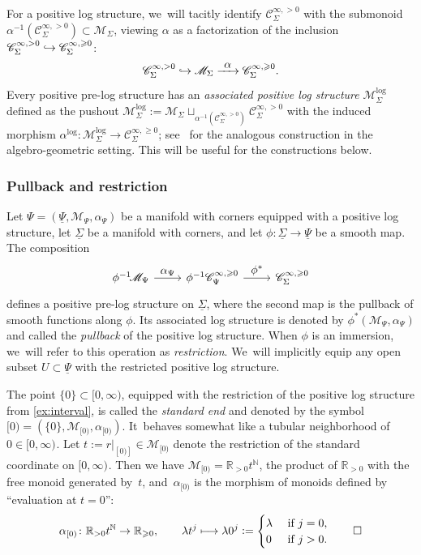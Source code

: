 \documentclass[10pt]{amsart}
\let\tst\textstyle
\newcommand\mto{\mathchoice{\longmapsto}{\mapsto}{\mapsto}{\mapsto}}
\newcommand\hto{\mathrel{\lhook\joinrel\to}}
\newcommand{\To}[1]{\mathchoice{\xrightarrow{\textstyle\kern4pt#1\kern3pt}}{\stackrel{#1}{\longrightarrow}}{}{}}
\theoremstyle{definition}
\theoremstyle{remark}
\newenvironment{example}
  {\pushQED{\qed}\renewcommand{\qedsymbol}{$\lozenge$}\examplex}
  {\popQED\endexamplex}
\let\defn\emph
\newcommand{\RR}{\mathbb{R}}
\newcommand{\NN}{\mathbb{N}}
\newcommand{\halfspc}[1]{[0,\infty)^{#1}}
\renewcommand{\ge}{\geqslant}
\newcommand{\defas}{\mathrel{\mathop:}=}
\newcommand{\cM}{\mathscr{M}}
\newcommand{\Cinfpos}[1]{\mathscr{C}^{\infty, > 0}_{#1}}
\newcommand{\Cinfge}[1]{\mathscr{C}^{\infty, \ge 0}_{#1}}
\newcommand{\Sig}{\Sigma}
\newcommand{\uSig}{\underline{\Sigma}}
\begin{document}
For a positive log structure, we~will tacitly identify $\Cinfpos{\Sig}$ with the submonoid $\alpha^{-1}(\Cinfpos{\Sig}) \subset \cM_\Sig$, viewing $\alpha$ as a factorization of the inclusion $\Cinfpos{\Sig} \hto\Cinfge{\Sig}$:\vspace*{-3pt}
\[
\Cinfpos{\Sig}\hto \cM_\Sig \To{\alpha} \Cinfge{\Sig}.
\]
Every positive pre-log structure has an \defn{associated positive log structure} $\cM_{\Sig}^{\log}$ defined as the pushout $\cM_{\Sig}^{\log} := \cM_{\Sig} \sqcup_{\alpha^{-1}(\Cinfpos{\Sig})} \Cinfpos{\Sig}$
with the induced morphism $\alpha^{\log }: \cM_{\Sig}^{\log} \to \Cinfge{\Sig}$; see~\cite[\S{}I.1.1 and \S{}III.1.1.3]{Ogus} for the analogous construction in the algebro-geometric setting. This will be useful for the constructions below.

\subsubsection{Pullback and restriction}

Let $\Psi=(\underline{\Psi},\cM_\Psi,\alpha_\Psi)$ be a manifold with corners equipped with a positive log structure, let $\uSig$ be a manifold with corners, and let $\phi:\uSig\to \underline{\Psi}$ be a smooth map. The composition\vspace*{-3pt}
\[
\begin{tikzcd}
\phi^{-1}\!\cM_{\Psi} \ar[r,"\tst \alpha_\Psi"] & \phi^{-1}\Cinfge{\Psi} \ar[r,"\tst \phi^*"] & \Cinfge{\Sig}
\end{tikzcd}
\]
defines a positive pre-log structure on $\uSig$, where the second map is the pullback of smooth functions along $\phi$. Its associated log structure
is denoted by $\phi^*(\cM_\Psi,\alpha_\Psi)$ and called the \defn{pullback} of the positive log structure. When $\phi$ is an immersion, we~will refer to this operation as \defn{restriction}. We~will implicitly equip any open subset $U\subset \underline{\Psi}$ with the restricted positive log structure.

\begin{example}\label{ex:endpoint}
The point $\{0\}\subset [0,\infty)$, equipped with the restriction of the positive log structure from \autoref{ex:interval}, is called the \defn{standard end} and denoted by the symbol $[0) = (\{0\},\cM_{[0)},\alpha_{[0)})$. It~behaves somewhat like a tubular neighborhood of $0\in\halfspc{}$. Let $t:= r|_{[0)]} \in \cM_{[0)}$ denote the restriction of the standard coordinate on $\halfspc{}$. Then we have $\cM_{[0)}=\RR_{>0} t^\NN$, the product of $\RR_{>0}$ with the free monoid generated by~$t$, and~$\alpha_{[0)}$ is the morphism of monoids defined by ``evaluation at $t=0$'':\vspace*{-3pt}
\[
\alpha_{[0)}\colon \RR_{>0} t^\NN \to \RR_{\ge 0}, \qquad \lambda t^j\mto \lambda 0^j \defas \begin{cases} \lambda & \mbox{ if } j=0,\\ 0 & \mbox{ if } j>0. \end{cases}\qedhere
\]
\end{example}
\end{document}
